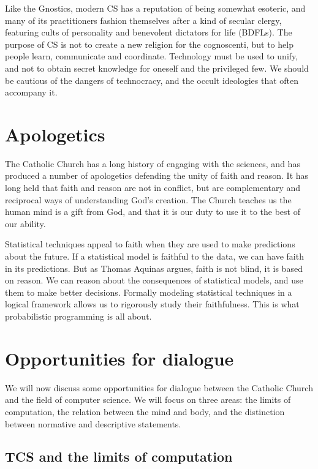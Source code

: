 \documentclass[sigplan,nonacm]{acmart}\settopmatter{printfolios=false,printccs=false,printacmref=false}
\begin{document}
  Like the Gnostics, modern CS has a reputation of being somewhat esoteric, and many of its practitioners fashion themselves after a kind of secular clergy, featuring cults of personality and benevolent dictators for life (BDFLs). The purpose of CS is not to create a new religion for the cognoscenti, but to help people learn, communicate and coordinate. Technology must be used to unify, and not to obtain secret knowledge for oneself and the privileged few. We should be cautious of the dangers of technocracy, and the occult ideologies that often accompany it.

  \section{Apologetics}

  The Catholic Church has a long history of engaging with the sciences, and has produced a number of apologetics defending the unity of faith and reason. It has long held that faith and reason are not in conflict, but are complementary and reciprocal ways of understanding God's creation. The Church teaches us the human mind is a gift from God, and that it is our duty to use it to the best of our ability.

  Statistical techniques appeal to faith when they are used to make predictions about the future. If a statistical model is faithful to the data, we can have faith in its predictions. But as Thomas Aquinas argues, faith is not blind, it is based on reason. We can reason about the consequences of statistical models, and use them to make better decisions. Formally modeling statistical techniques in a logical framework allows us to rigorously study their faithfulness. This is what probabilistic programming is all about.

  \section{Opportunities for dialogue}

  We will now discuss some opportunities for dialogue between the Catholic Church and the field of computer science. We will focus on three areas: the limits of computation, the relation between the mind and body, and the distinction between normative and descriptive statements.

  \subsection{TCS and the limits of computation}
\end{document}

